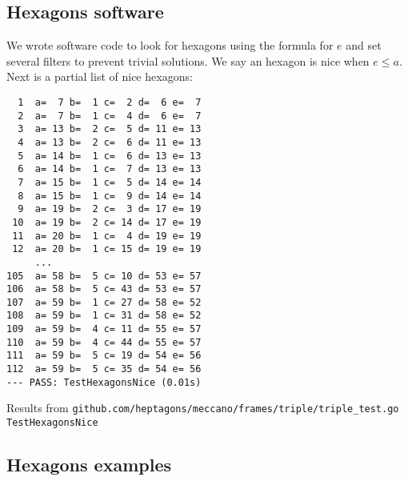\documentclass[11pt]{article}
\begin{document}

\subsection{Hexagons software}
We wrote software code to look for hexagons using the formula for $e$ and set several
filters to prevent trivial solutions. We say an hexagon is nice when $e \leq a$.
Next is a partial list of nice hexagons:
\begin{lstlisting}
  1  a=  7 b=  1 c=  2 d=  6 e=  7
  2  a=  7 b=  1 c=  4 d=  6 e=  7
  3  a= 13 b=  2 c=  5 d= 11 e= 13
  4  a= 13 b=  2 c=  6 d= 11 e= 13
  5  a= 14 b=  1 c=  6 d= 13 e= 13
  6  a= 14 b=  1 c=  7 d= 13 e= 13
  7  a= 15 b=  1 c=  5 d= 14 e= 14
  8  a= 15 b=  1 c=  9 d= 14 e= 14
  9  a= 19 b=  2 c=  3 d= 17 e= 19
 10  a= 19 b=  2 c= 14 d= 17 e= 19
 11  a= 20 b=  1 c=  4 d= 19 e= 19
 12  a= 20 b=  1 c= 15 d= 19 e= 19
     ...
105  a= 58 b=  5 c= 10 d= 53 e= 57
106  a= 58 b=  5 c= 43 d= 53 e= 57
107  a= 59 b=  1 c= 27 d= 58 e= 52
108  a= 59 b=  1 c= 31 d= 58 e= 52
109  a= 59 b=  4 c= 11 d= 55 e= 57
110  a= 59 b=  4 c= 44 d= 55 e= 57
111  a= 59 b=  5 c= 19 d= 54 e= 56
112  a= 59 b=  5 c= 35 d= 54 e= 56
--- PASS: TestHexagonsNice (0.01s)
\end{lstlisting}
Results from \texttt{github.com/heptagons/meccano/frames/triple/triple\_test.go TestHexagonsNice}

\subsection{Hexagons examples}
\end{document}
